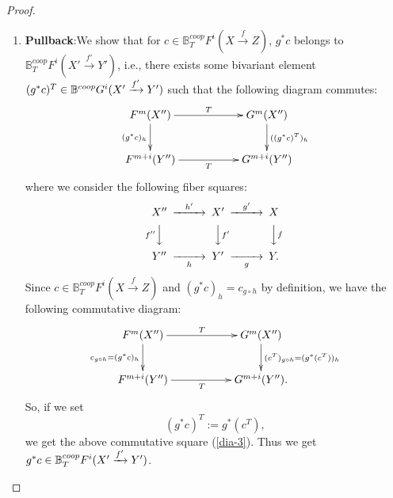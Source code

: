 \documentclass[a4paper]{amsart}
\begin{document}
\begin{proof}
\begin{enumerate}
\item {\bf Pullback}:We show that for $c \in \mathbb B^{coop}_TF^i(X \xrightarrow f Z)$, $g^*c$ belongs to $\mathbb B^{coop}_TF^i(X' \xrightarrow {f'} Y')$, i.e., there exists some bivariant element $(g^*c)^T  \in \mathbb B^{coop}G^i(X' \xrightarrow {f'} Y')$ such that the following diagram commutes:
\begin{equation}\label{dia-3}
\xymatrix
{F^m(X'') \ar[d]_{(g^*c)_h} \ar[rr]^T && G^m(X'') \ar[d]^{((g^*c)^T)_h}\\
F^{m+i}(Y'') \ar[rr]_T && G^{m+i}(Y'')
}
\end{equation}
where we consider the following fiber squares:
\begin{equation*}
\CD
X'' @> {h'}  >> X' @> {g'}  >> X\\
@V {f''} VV @VV f'V @VV fV\\
Y'' @>> {h} > Y' @>> {g} > Y.\\
\endCD
\end{equation*}
Since $c \in \mathbb B^{coop}_TF^i(X \xrightarrow f Z)$ and $(g^*c)_h = c_{g \circ h}$ by definition, we have the following commutative diagram:
\begin{equation}\label{cd-4}
\xymatrix
{F^m(X'') \ar[d]_{c_{g \circ h} = (g^*c)_h} \ar[rr]^T && G^m(X'') \ar[d]^{(c^T)_{g \circ h} = (g^*(c^T))_h}\\
F^{m+i}(Y'') \ar[rr]_T && G^{m+i}(Y'').
}
\end{equation}
So, if we set 
\begin{equation*}
(g^*c)^T:=g^*(c^T),
\end{equation*} 
we get the above commutative square (\ref{dia-3}). Thus we get $g^*c \in \mathbb B^{coop}_TF^i(X' \xrightarrow {f'} Y')$.
\end{enumerate}
\end{proof}
\end{document}

